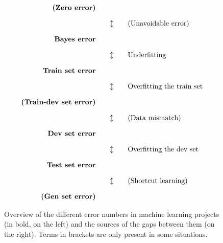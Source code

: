 \documentclass[12pt,openany, draft]{book}
\begin{document}
\begin{figure}[H]
    \centering
    \[
    \begin{array}{r@{\hspace{2em}}c@{\hspace{2em}}l}
        \textbf{(Zero error)} & & \\[1em]
        & \updownarrow & \text{(Unavoidable error)} \\[1em]
        \textbf{Bayes error} & & \\[1em]
        & \updownarrow & \text{Underfitting} \\[1em]
        \textbf{Train set error} & & \\[1em]
        & \updownarrow & \text{Overfitting the train set} \\[1em]
        \textbf{(Train-dev set error)} & & \\[1em]
        & \updownarrow & \text{(Data mismatch)} \\[1em]
        \textbf{Dev set error} & & \\[1em]
        & \updownarrow & \text{Overfitting the dev set} \\[1em]
        \textbf{Test set error} & & \\[1em]
        & \updownarrow & \text{(Shortcut learning)} \\[1em]
        \textbf{(Gen set error)} & & \\
    \end{array}
    \]
    \caption{Overview of the different error numbers in machine learning projects (in bold, on the left) and the sources of the gaps between them (on the right). Terms in brackets are only present in some situations.}
    \label{fig:error-hierarchy}
\end{figure}
\end{document}
